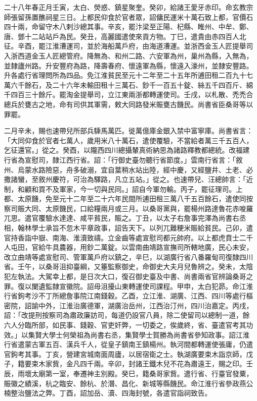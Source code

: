 \begin{pinyinscope}
 二十八年春正月壬寅，太白、熒惑、鎮星聚奎。癸卯，給諸王愛牙赤印。命玄教宗師張留孫置醮祠星三日。上都民仰食於官者眾，詔傭民運米十萬石致上都，官價石四十兩，命留守木八剌沙總其事。辛亥，罷汴梁至正陽、杞縣、睢州、中牟、鄭、唐、鄧十二站站戶為民。癸丑，高麗國遣使來貢方物。丁巳，遣貴由赤四百人北征。辛酉，罷江淮漕運司，並於海船萬戶府，由海道漕運。並浙西金玉人匠提舉司入浙西道金玉人匠總管府。降無為、和州二路、六安軍為州，巢州為縣，入無為，並隸廬州路。升安豐府為路，降壽春府、懷遠軍為縣，懷遠入濠州，並隸安豐路。升各處行省理問所為四品。免江淮貧民至元十二年至二十五年所逋田租二百九十七萬六千餘石，及二十六年未輸田租十三萬石、鈔千一百五十錠、絲五千四百斤、綿千四百三十餘斤。罷淘金提舉司，立江東兩浙都轉運使司。壬戌，以札散、禿禿合總兵於甕古之地，命有司供其軍需，敕大同路發米賑甕古饑民。尚書省臣桑哥等以罪罷。



 二月辛未，賜也速帶兒所部兵騬馬萬匹。徙萬億庫金銀入禁中富寧庫。尚書省言：「大同仰食於官者七萬人，歲用米八十萬石，遣使覆驗，不當給者萬三千五百人，乞征還官。」從之。癸酉，以隴西四川總攝輦真術納思為諸路釋教都總統。改福建行省為宣慰司，隸江西行省。詔：「行御史臺勿聽行省節度。」雲南行省言：「敘州、烏蒙水路險惡，舟多破溺，宜自葉稍水站出陸，經中慶，又經鹽井、土老、必撒諸蠻，至敘州慶符，可治為驛路，凡立五站。」從之。也速帶兒、汪總帥言：「近制，和顧和買不及軍家，今一切與民同。」詔自今軍勿輸。丙子，罷征理司。上都、太原饑，免至元十二年至二十六年民間所逋田租三萬八千五百餘石，遣使同按察司賑大同、太原饑民，口給糧兩月或三月。以桑哥黨與，罷楊州路達魯花赤唆羅兀思。遣官覆驗水達達、咸平貧民，賑之。丁丑，以太子右詹事完澤為尚書右丞相，翰林學士承旨不忽木平章政事，詔告天下。以列兀難粳米賑給貧民。己卯，遣官持香詣中嶽、南海、淮瀆致禱。立金齒等處宣慰司都元帥府。以上都虎賁士二千人屯田，官給牛具農器，用鈔二萬錠。以雲南曲靖路宣撫司所轄地廣，民心未安，改立曲靖等處宣慰司、管軍萬戶府以鎮之，辛巳，以湖廣行省八番羅甸司復隸四川省。壬午，以桑哥沮抑臺綱，又箠監察御史，命御史大夫月兒魯辨之。癸未，太陰犯左執法。大駕幸上都，是日次大口，復召御史臺及中書、尚書兩省官辨論桑哥之罪。復以闌遺監隸宣徽院。詔毋沮擾山東轉運使司課程。甲申，太白犯昴。命江淮行省鉤考沙不丁所總詹事院江南錢穀。乙酉，立江淮、湖廣、江西、四川等處行樞密院，詔諭中外，江淮治廣德軍，湖廣治岳州，江西治汀州，四川治嘉定。丙戌，詔：「改提刑按察司為肅政廉訪司，每道仍設官八員，除二使留司以總制一道，餘六人分臨所部，如民事、錢穀、官吏奸弊，一切委之，俟歲終，省、臺遣官考其功效。」以集賢大學士何榮祖為尚書右丞，集賢學士賀勝為尚書省參知政事。詔江淮行省遣蒙古軍五百、漢兵千人，從皇子鎮南王鎮楊州。執河間都轉運使張庸，仍遣官鉤考其事。丁亥，營建宮城南面周廬，以居宿衛之士。執湖廣要束木詣京師，戊子，籍要束木家貲，金凡四千兩。辛卯，封諸王鐵木兒不花為肅遠王，賜之印。壬辰，雨壞太廟第一室，奉遷神主別殿。癸巳，籍桑哥家貲。遣行省、行臺官發粟，賑徽之績溪，杭之臨安、餘杭、於潛、昌化、新城等縣饑民。命江淮行省參政燕公楠整治鹽法之弊。丁酉，詔加岳、瀆、四海封號，各遣官詣祠致告。




\end{pinyinscope}
